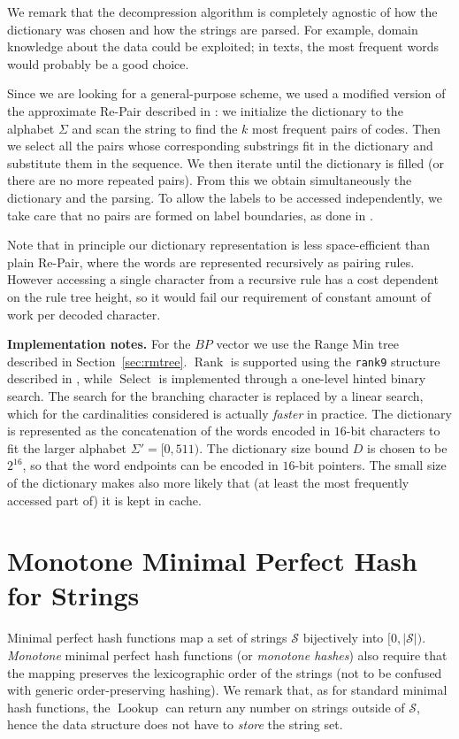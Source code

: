 \documentclass[a4paper,11pt]{article}
\newcommand{\ttlpar}[1]{\noindent\textbf{#1}}
\theoremstyle{nonumberplain}
\DeclareMathOperator{\Rank}{Rank}
\DeclareMathOperator{\Select}{Select}
\DeclareMathOperator{\Lookup}{Lookup}
\begin{document}
We remark that the decompression algorithm is completely agnostic of
how the dictionary was chosen and how the strings are parsed. For example, 
domain knowledge about the data could be exploited; in texts, the most
frequent words would probably be a good choice. 

Since we are looking for a general-purpose scheme, we used a modified
version of the approximate Re-Pair \cite{repair} described in
\cite{navarrorepair}: we initialize the dictionary to the alphabet
$\Sigma$ and scan the string to find the $k$ most frequent pairs of
codes. Then we select all the pairs whose corresponding substrings fit
in the dictionary and substitute them in the sequence. We then iterate
until the dictionary is filled (or there are no more repeated pairs).
From this we obtain simultaneously the dictionary and the parsing.
To allow the labels to be accessed independently, we take care that no
pairs are formed on label boundaries, as done in \cite{csd11}.

Note that in principle our dictionary representation is less
space-efficient than plain Re-Pair, where the words are represented
recursively as pairing rules. However accessing a single character
from a recursive rule has a cost dependent on the rule tree height, so
it would fail our requirement of constant amount of work per decoded
character.

\ttlpar{Implementation notes.} 
For the $BP$ vector we use the Range Min tree described in
Section~\ref{sec:rmtree}. $\Rank$ is supported using the
\texttt{rank9} structure described in \cite{vigna08}, while $\Select$
is implemented through a one-level hinted binary search. The search for
the branching character is replaced by a linear search, which for the
cardinalities considered is actually \emph{faster} in practice. 
The dictionary is represented as the concatenation of the
words encoded in $16$-bit characters to fit the larger alphabet
$\Sigma' = [0, 511)$. The dictionary size bound $D$ is chosen to be
$2^{16}$, so that the word endpoints can be encoded in $16$-bit
pointers. The small size of the dictionary makes also more likely that
(at least the most frequently accessed part of) it is kept in cache.



\section{Monotone Minimal Perfect Hash for Strings}
\label{sec:hollow}

Minimal perfect hash functions map a set of strings $\mathcal{S}$
bijectively into $[0, |\mathcal{S}|)$. \emph{Monotone} minimal perfect
hash functions \cite{monotonehashsoda} (or \emph{monotone hashes})
also require that the mapping preserves the lexicographic order of the
strings (not to be confused with generic order-preserving hashing).
We remark that, as for standard minimal hash functions, the $\Lookup$
can return any number on strings outside of $\mathcal{S}$, hence the
data structure does not have to \emph{store} the string set.
\end{document}

